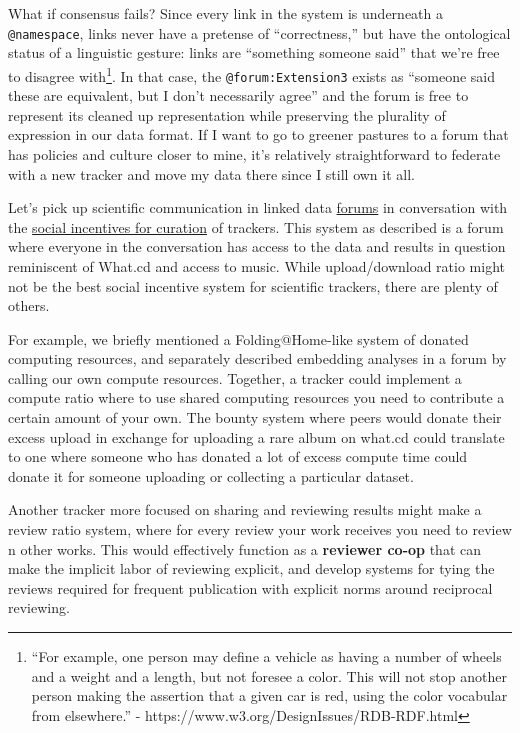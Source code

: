 \documentclass[10pt]{tufte-book}
\begin{document}
What if consensus fails? Since every link in the system is underneath a
\texttt{@namespace}, links never have a pretense of ``correctness,'' but
have the ontological status of a linguistic gesture: links are
``something someone said'' that we're free to disagree with\footnote{``For
  example, one person may define a vehicle as having a number of wheels
  and a weight and a length, but not foresee a color. This will not stop
  another person making the assertion that a given car is red, using the
  color vocabular from elsewhere.'' -
  https://www.w3.org/DesignIssues/RDB-RDF.html}. In that case, the
\texttt{@forum:Extension3} exists as ``someone said these are
equivalent, but I don't necessarily agree'' and the forum is free to
represent its cleaned up representation while preserving the plurality
of expression in our data format. If I want to go to greener pastures to
a forum that has policies and culture closer to mine, it's relatively
straightforward to federate with a new tracker and move my data there
since I still own it all.

Let's pick up scientific communication in linked data
\protect\hyperlink{forums--feeds}{forums} in conversation with the
\protect\hyperlink{archives-need-communities}{social incentives for
curation} of trackers. This system as described is a forum where
everyone in the conversation has access to the data and results in
question reminiscent of What.cd and access to music. While
upload/download ratio might not be the best social incentive system for
scientific trackers, there are plenty of others.

For example, we briefly mentioned a Folding@Home-like system of donated
computing resources, and separately described embedding analyses in a
forum by calling our own compute resources. Together, a tracker could
implement a compute ratio where to use shared computing resources you
need to contribute a certain amount of your own. The bounty system where
peers would donate their excess upload in exchange for uploading a rare
album on what.cd could translate to one where someone who has donated a
lot of excess compute time could donate it for someone uploading or
collecting a particular dataset.

Another tracker more focused on sharing and reviewing results might make
a review ratio system, where for every review your work receives you
need to review n other works. This would effectively function as a
\textbf{reviewer co-op} that can make the implicit labor of reviewing
explicit, and develop systems for tying the reviews required for
frequent publication with explicit norms around reciprocal reviewing.
\end{document}
